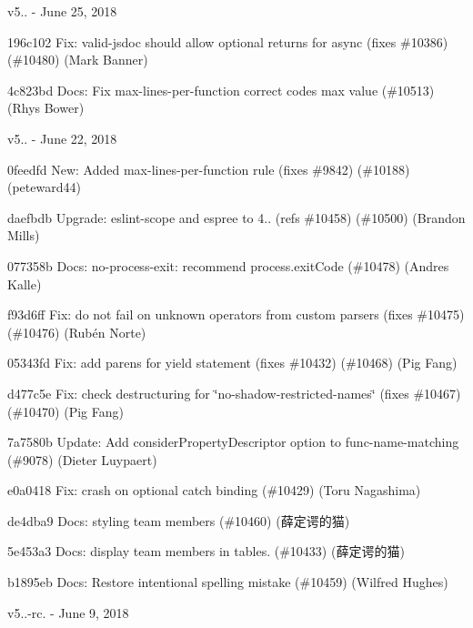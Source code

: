 v5.. -\/ June 25, 2018


\begin{DoxyItemize}
\item 196c102 Fix\+: valid-\/jsdoc should allow optional returns for async (fixes \#10386) (\#10480) (Mark Banner)
\item 4c823bd Docs\+: Fix max-\/lines-\/per-\/function correct code\textquotesingle{}s max value (\#10513) (Rhys Bower)
\end{DoxyItemize}

v5.. -\/ June 22, 2018


\begin{DoxyItemize}
\item 0feedfd New\+: Added max-\/lines-\/per-\/function rule (fixes \#9842) (\#10188) (peteward44)
\item daefbdb Upgrade\+: eslint-\/scope and espree to 4.. (refs \#10458) (\#10500) (Brandon Mills)
\item 077358b Docs\+: no-\/process-\/exit\+: recommend process.\+exit\+Code (\#10478) (Andres Kalle)
\item f93d6ff Fix\+: do not fail on unknown operators from custom parsers (fixes \#10475) (\#10476) (Rubén Norte)
\item 05343fd Fix\+: add parens for yield statement (fixes \#10432) (\#10468) (Pig Fang)
\item d477c5e Fix\+: check destructuring for \char`\"{}no-\/shadow-\/restricted-\/names\char`\"{} (fixes \#10467) (\#10470) (Pig Fang)
\item 7a7580b Update\+: Add consider\+Property\+Descriptor option to func-\/name-\/matching (\#9078) (Dieter Luypaert)
\item e0a0418 Fix\+: crash on optional catch binding (\#10429) (Toru Nagashima)
\item de4dba9 Docs\+: styling team members (\#10460) (薛定谔的猫)
\item 5e453a3 Docs\+: display team members in tables. (\#10433) (薛定谔的猫)
\item b1895eb Docs\+: Restore intentional spelling mistake (\#10459) (Wilfred Hughes)
\end{DoxyItemize}

v5..-\/rc. -\/ June 9, 2018


